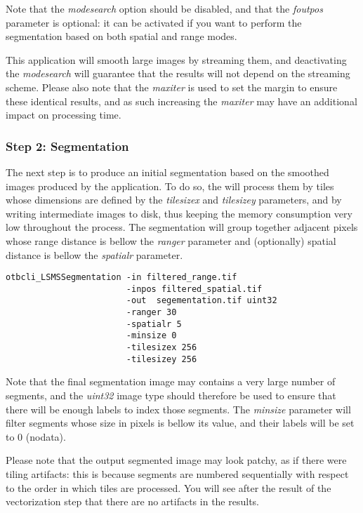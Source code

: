 Note that the \emph{modesearch} option should be disabled, and
that the \emph{foutpos} parameter is optional: it can be activated
if you want to perform the segmentation based on both spatial and
range modes.

This application will smooth large images by streaming them, and
deactivating the \emph{modesearch} will guarantee that the results
will not depend on the streaming scheme. Please also note that the
\emph{maxiter} is used to set the margin to ensure these
identical results, and as such increasing the \emph{maxiter} may
have an additional impact on processing time.

\subsubsection{Step 2: Segmentation}

The next step is to produce an initial segmentation based on the
smoothed images produced by the 
application. To do so, the  will process
them by tiles whose dimensions are defined by the
\emph{tilesizex} and \emph{tilesizey} parameters, and by
writing intermediate images to disk, thus keeping the memory
consumption very low throughout the process. The segmentation will
group together adjacent pixels whose range distance is bellow the
\emph{ranger} parameter and (optionally) spatial distance is
bellow the \emph{spatialr} parameter.

\begin{verbatim}
otbcli_LSMSSegmentation -in filtered_range.tif
                        -inpos filtered_spatial.tif
                        -out  segementation.tif uint32 
                        -ranger 30 
                        -spatialr 5 
                        -minsize 0 
                        -tilesizex 256 
                        -tilesizey 256
\end{verbatim}

Note that the final segmentation image may contains a very large
number of segments, and the \emph{uint32} image type should
therefore be used to ensure that there will be enough labels to index
those segments. The \emph{minsize} parameter will filter segments
whose size in pixels is bellow its value, and their labels will be set
to 0 (nodata). 

Please note that the output segmented image may look patchy, as if
there were tiling artifacts: this is because segments are numbered
sequentially with respect to the order in which tiles are
processed. You will see after the result of the vectorization step
that there are no artifacts in the results.

